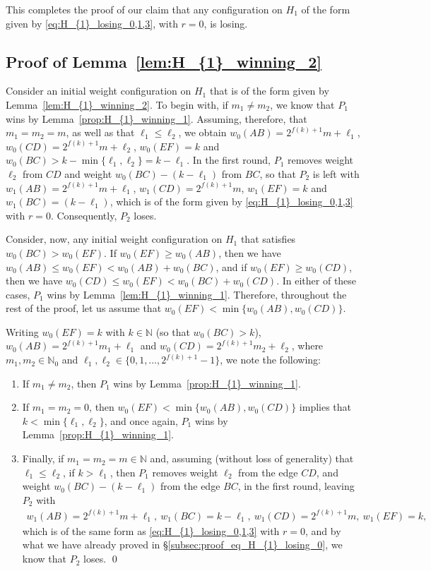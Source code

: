 \documentclass[11pt,reqno]{amsart}
\theoremstyle{definition}
\theoremstyle{definition}
\begin{document}
This completes the proof of our claim that any configuration on $H_{1}$ of the form given by \eqref{eq:H_{1}_losing_0,1,3}, with $r=0$, is losing.

\subsection{Proof of Lemma~\ref{lem:H_{1}_winning_2}}\label{subsec:proof_H_{1}_winning_2_lemma}
Consider an initial weight configuration on $H_{1}$ that is of the form given by Lemma~\ref{lem:H_{1}_winning_2}. To begin with, if $m_{1}\neq m_{2}$, we know that $P_{1}$ wins by Lemma~\ref{prop:H_{1}_winning_1}. Assuming, therefore, that $m_{1}=m_{2}=m$, as well as that $\ell_{1} \leqslant \ell_{2}$, we obtain $w_{0}(AB)=2^{f(k)+1}m+\ell_{1}$, $w_{0}(CD)=2^{f(k)+1}m+\ell_{2}$, $w_{0}(EF)=k$ and $w_{0}(BC)>k-\min\{\ell_{1},\ell_{2}\}=k-\ell_{1}$. In the first round, $P_{1}$ removes weight $\ell_{2}$ from $CD$ and weight $w_{0}(BC)-(k-\ell_{1})$ from $BC$, so that $P_{2}$ is left with $w_{1}(AB)=2^{f(k)+1}m+\ell_{1}$, $w_{1}(CD)=2^{f(k)+1}m$, $w_{1}(EF)=k$ and $w_{1}(BC)=(k-\ell_{1})$, which is of the form given by \eqref{eq:H_{1}_losing_0,1,3} with $r=0$. Consequently, $P_{2}$ loses.

Consider, now, any initial weight configuration on $H_{1}$ that satisfies $w_{0}(BC)>w_{0}(EF)$. If $w_{0}(EF)\geqslant w_{0}(AB)$, then we have $w_{0}(AB)\leqslant w_{0}(EF)<w_{0}(AB)+w_{0}(BC)$, and if $w_{0}(EF)\geqslant w_{0}(CD)$, then we have $w_{0}(CD)\leqslant w_{0}(EF)<w_{0}(BC)+w_{0}(CD)$. In either of these cases, $P_{1}$ wins by Lemma~\ref{lem:H_{1}_winning_1}. Therefore, throughout the rest of the proof, let us assume that $w_{0}(EF)<\min\{w_{0}(AB),w_{0}(CD)\}$. 

Writing $w_{0}(EF)=k$ with $k \in \mathbb{N}$ (so that $w_{0}(BC)>k$), $w_{0}(AB)=2^{f(k)+1}m_{1}+\ell_{1}$ and $w_{0}(CD)=2^{f(k)+1}m_{2}+\ell_{2}$, where $m_{1}, m_{2} \in \mathbb{N}_{0}$ and $\ell_{1}, \ell_{2} \in \{0,1,\ldots,2^{f(k)+1}-1\}$, we note the following:
\begin{enumerate}
\item If $m_{1}\neq m_{2}$, then $P_{1}$ wins by Lemma~\ref{prop:H_{1}_winning_1}.
\item If $m_{1}=m_{2}=0$, then $w_{0}(EF)<\min\{w_{0}(AB),w_{0}(CD)\}$ implies that $k<\min\{\ell_{1},\ell_{2}\}$, and once again, $P_{1}$ wins by Lemma~\ref{prop:H_{1}_winning_1}.
\item Finally, if $m_{1}=m_{2}=m\in \mathbb{N}$ and, assuming (without loss of generality) that $\ell_{1}\leqslant \ell_{2}$, if $k>\ell_{1}$, then $P_{1}$ removes weight $\ell_{2}$ from the edge $CD$, and weight $w_{0}(BC)-(k-\ell_{1})$ from the edge $BC$, in the first round, leaving $P_{2}$ with
\begin{align}
w_{1}(AB)=2^{f(k)+1}m+\ell_{1},\ w_{1}(BC)=k-\ell_{1},\ w_{1}(CD)=2^{f(k)+1}m,\ w_{1}(EF)=k,\nonumber
\end{align}
which is of the same form as \eqref{eq:H_{1}_losing_0,1,3} with $r=0$, and by what we have already proved in \S\ref{subsec:proof_eq_H_{1}_losing_0}, we know that $P_{2}$ loses. \qed
\end{enumerate}
\end{document}
